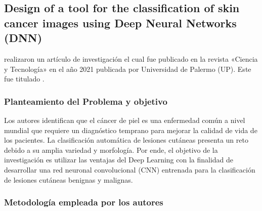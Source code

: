 \subsection{Design of a tool for the classification of skin cancer images using Deep Neural Networks (DNN) \citep*{vargas_2021diseno}}

\citeauthor{vargas_2021diseno} realizaron un artículo de investigación el cual fue publicado en la revista «Ciencia y Tecnología» en el año 2021 publicada por Universidad de Palermo (UP). Este fue titulado .


\subsubsection{Planteamiento del Problema y objetivo}
Los autores identifican que el cáncer de piel es una enfermedad común a nivel mundial que requiere un diagnóstico temprano para mejorar la calidad de vida de los pacientes. La clasificación automática de lesiones cutáneas presenta un reto debido a su amplia variedad y morfología. Por ende, el objetivo de la investigación es utilizar las ventajas del Deep Learning con la finalidad de desarrollar una red neuronal convolucional (CNN) entrenada para la clasificación de lesiones cutáneas benignas y malignas.

\subsubsection{Metodología empleada por los autores}
\newcommand{\MEDone}{Recopilación de la data: Se uso dos bases de datos entre ellas HAM10000 compuesta por 10015 imágenes dermatoscópicas y ISIC (The International Skin Imaging Collaboration)la cual consta de 2357 imágenes de 226x226 píxeles de enfermedades oncológicas malignas y benignas.
}
\newcommand{\MEDtwo}{ Preprocesamiento:Se aplicó Transfer Learning para compartir características generales de bases de datos extensas, mejorando el rendimient. Haciendo uso de estrategias como Data Augmentation, ajuste de la tasa de aprendizaje y validación K-fold se implementaron para mejorar los modelos.
}

